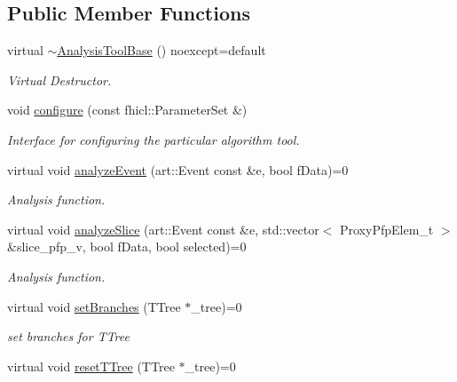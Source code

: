 \subsection*{Public Member Functions}
\begin{DoxyCompactItemize}
\item 
virtual \hyperlink{classanalysis_1_1AnalysisToolBase_a24a388ad7ccb4007307b2e429acc8967}{$\sim$\+Analysis\+Tool\+Base} () noexcept=default\hypertarget{classanalysis_1_1AnalysisToolBase_a24a388ad7ccb4007307b2e429acc8967}{}\label{classanalysis_1_1AnalysisToolBase_a24a388ad7ccb4007307b2e429acc8967}

\begin{DoxyCompactList}\small\item\em Virtual Destructor. \end{DoxyCompactList}\item 
void \hyperlink{classanalysis_1_1AnalysisToolBase_a99bb8301fb7988663c6febc152e4060f}{configure} (const fhicl\+::\+Parameter\+Set \&)
\begin{DoxyCompactList}\small\item\em Interface for configuring the particular algorithm tool. \end{DoxyCompactList}\item 
virtual void \hyperlink{classanalysis_1_1AnalysisToolBase_ad5079f85c78e6c40f70ebf4ee31f5600}{analyze\+Event} (art\+::\+Event const \&e, bool f\+Data)=0
\begin{DoxyCompactList}\small\item\em Analysis function. \end{DoxyCompactList}\item 
virtual void \hyperlink{classanalysis_1_1AnalysisToolBase_ac1611ea1b1a5db62a6543709ec1d2e96}{analyze\+Slice} (art\+::\+Event const \&e, std\+::vector$<$ Proxy\+Pfp\+Elem\+\_\+t $>$ \&slice\+\_\+pfp\+\_\+v, bool f\+Data, bool selected)=0
\begin{DoxyCompactList}\small\item\em Analysis function. \end{DoxyCompactList}\item 
virtual void \hyperlink{classanalysis_1_1AnalysisToolBase_a03a79460c4d2466d0b9fa102517a4a2d}{set\+Branches} (T\+Tree $\ast$\+\_\+tree)=0\hypertarget{classanalysis_1_1AnalysisToolBase_a03a79460c4d2466d0b9fa102517a4a2d}{}\label{classanalysis_1_1AnalysisToolBase_a03a79460c4d2466d0b9fa102517a4a2d}

\begin{DoxyCompactList}\small\item\em set branches for T\+Tree \end{DoxyCompactList}\item 
virtual void \hyperlink{classanalysis_1_1AnalysisToolBase_a005e4aa5853d1f2ebc4592b73ae3f9cc}{reset\+T\+Tree} (T\+Tree $\ast$\+\_\+tree)=0\hypertarget{classanalysis_1_1AnalysisToolBase_a005e4aa5853d1f2ebc4592b73ae3f9cc}{}\label{classanalysis_1_1AnalysisToolBase_a005e4aa5853d1f2ebc4592b73ae3f9cc}


\end{DoxyCompactItemize}
